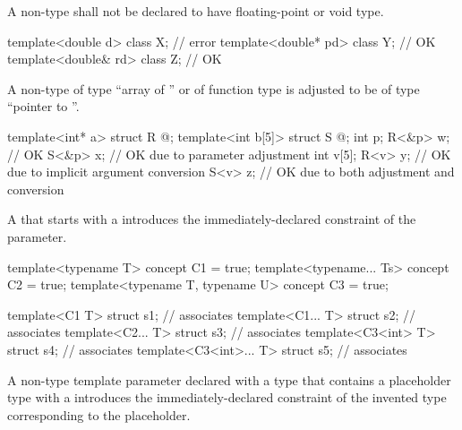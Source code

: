 \pnum
A non-type
shall not be declared to have floating-point or void type.
\begin{example}

\begin{codeblock}
template<double d> class X;     // error
template<double* pd> class Y;   // OK
template<double& rd> class Z;   // OK
\end{codeblock}
\end{example}

\pnum
A non-type
%
of type ``array of '' or
%
of function type 
is adjusted to be of type ``pointer to ''.
\begin{example}

\begin{codeblock}
template<int* a>   struct R { @\commentellip@ };
template<int b[5]> struct S { @\commentellip@ };
int p;
R<&p> w;                        // OK
S<&p> x;                        // OK due to parameter adjustment
int v[5];
R<v> y;                         // OK due to implicit argument conversion
S<v> z;                         // OK due to both adjustment and conversion
\end{codeblock}
\end{example}

\pnum
A  that starts with a 
introduces the immediately-declared constraint of the parameter.
\begin{example}
\begin{codeblock}
template<typename T> concept C1 = true;
template<typename... Ts> concept C2 = true;
template<typename T, typename U> concept C3 = true;

template<C1 T> struct s1;              // associates 
template<C1... T> struct s2;           // associates 
template<C2... T> struct s3;           // associates 
template<C3<int> T> struct s4;         // associates 
template<C3<int>... T> struct s5;      // associates 
\end{codeblock}
\end{example}

\pnum
A non-type template parameter declared with a type that
contains a placeholder type with a 
introduces the immediately-declared constraint of
the invented type corresponding to the placeholder.

